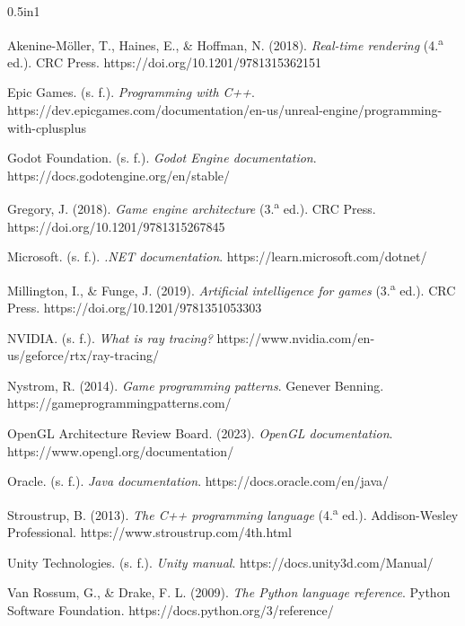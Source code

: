 \documentclass[12pt]{report}
\begin{document}
\begin{hangparas}{0.5in}{1}

Akenine-Möller, T., Haines, E., \& Hoffman, N. (2018). \textit{Real-time rendering} (4.\textsuperscript{a} ed.). CRC Press. https://doi.org/10.1201/9781315362151\par

Epic Games. (s. f.). \textit{Programming with C++}. https://dev.epicgames.com/documentation/en-us/unreal-engine/programming-with-cplusplus\par

Godot Foundation. (s. f.). \textit{Godot Engine documentation}. https://docs.godotengine.org/en/stable/\par

Gregory, J. (2018). \textit{Game engine architecture} (3.\textsuperscript{a} ed.). CRC Press. https://doi.org/10.1201/9781315267845\par

Microsoft. (s. f.). \textit{.NET documentation}. https://learn.microsoft.com/dotnet/\par

Millington, I., \& Funge, J. (2019). \textit{Artificial intelligence for games} (3.\textsuperscript{a} ed.). CRC Press. https://doi.org/10.1201/9781351053303\par

NVIDIA. (s. f.). \textit{What is ray tracing?} https://www.nvidia.com/en-us/geforce/rtx/ray-tracing/\par

Nystrom, R. (2014). \textit{Game programming patterns}. Genever Benning. https://gameprogrammingpatterns.com/\par

OpenGL Architecture Review Board. (2023). \textit{OpenGL documentation}. https://www.opengl.org/documentation/\par

Oracle. (s. f.). \textit{Java documentation}. https://docs.oracle.com/en/java/\par

Stroustrup, B. (2013). \textit{The C++ programming language} (4.\textsuperscript{a} ed.). Addison-Wesley Professional. https://www.stroustrup.com/4th.html\par

Unity Technologies. (s. f.). \textit{Unity manual}. https://docs.unity3d.com/Manual/\par

Van Rossum, G., \& Drake, F. L. (2009). \textit{The Python language reference}. Python Software Foundation. https://docs.python.org/3/reference/\par

\end{hangparas}
\end{document}
